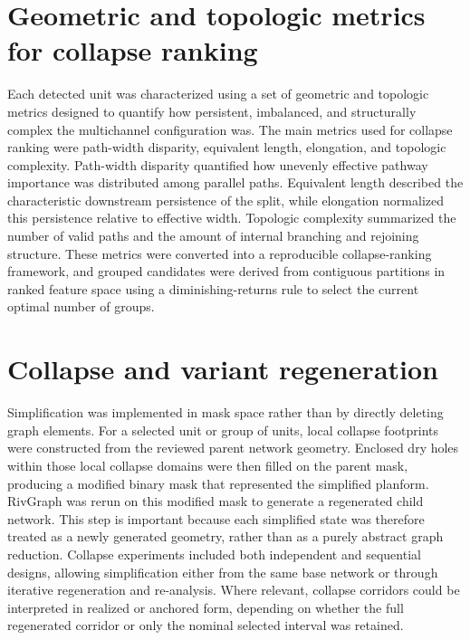 \documentclass[11pt]{article}
\begin{document}
\section{Geometric and topologic metrics for collapse ranking}
Each detected unit was characterized using a set of geometric and topologic metrics designed to quantify how persistent, imbalanced, and structurally complex the multichannel configuration was. The main metrics used for collapse ranking were path-width disparity, equivalent length, elongation, and topologic complexity. Path-width disparity quantified how unevenly effective pathway importance was distributed among parallel paths. Equivalent length described the characteristic downstream persistence of the split, while elongation normalized this persistence relative to effective width. Topologic complexity summarized the number of valid paths and the amount of internal branching and rejoining structure. These metrics were converted into a reproducible collapse-ranking framework, and grouped candidates were derived from contiguous partitions in ranked feature space using a diminishing-returns rule to select the current optimal number of groups.

\section{Collapse and variant regeneration}
Simplification was implemented in mask space rather than by directly deleting graph elements. For a selected unit or group of units, local collapse footprints were constructed from the reviewed parent network geometry. Enclosed dry holes within those local collapse domains were then filled on the parent mask, producing a modified binary mask that represented the simplified planform. RivGraph was rerun on this modified mask to generate a regenerated child network. This step is important because each simplified state was therefore treated as a newly generated geometry, rather than as a purely abstract graph reduction. Collapse experiments included both independent and sequential designs, allowing simplification either from the same base network or through iterative regeneration and re-analysis. Where relevant, collapse corridors could be interpreted in realized or anchored form, depending on whether the full regenerated corridor or only the nominal selected interval was retained.
\end{document}
